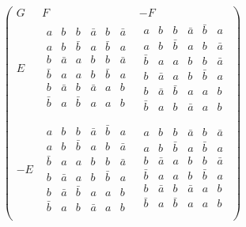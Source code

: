 \documentclass{beamer}
\begin{document}
\begin{frame}

  \[
    \left(
      \begin{array}{c|c|c}
        G & F & -F \\ \hline
        E
          &
            \begin{array}{cccccc}
              a&b&b&\bar{a}&b&\bar{a}\\
              a&b&\bar{b}&a&\bar{b}&a\\
              b&\bar{a}&a&b&b&\bar{a}\\
              \bar{b}&a&a&b&\bar{b}&a\\
              b&\bar{a}&b&\bar{a}&a&b\\
              \bar{b}&a&\bar{b}&a&a&b\\
            \end{array}
          &
          \begin{array}{cccccc}
            a&b&b&\bar{a}&\bar{b}&a\\
            a&b&\bar{b}&a&b&\bar{a}\\
            \bar{b}&a&a&b&b&\bar{a}\\
            b&\bar{a}&a&b&\bar{b}&a\\
            b&\bar{a}&\bar{b}&a&a&b\\
            \bar{b}&a&b&\bar{a}&a&b\\
          \end{array} 
        \\ \hline
        -E
          &
            \begin{array}{cccccc}
              a&b&b&\bar{a}&\bar{b}&a\\
              a&b&\bar{b}&a&b&\bar{a}\\
              \bar{b}&a&a&b&b&\bar{a}\\
              b&\bar{a}&a&b&\bar{b}&a\\
              b&\bar{a}&\bar{b}&a&a&b\\
              \bar{b}&a&b&\bar{a}&a&b\\
            \end{array}
          &
            \begin{array}{cccccc}
              a&b&b&\bar{a}&b&\bar{a}\\
              a&b&\bar{b}&a&\bar{b}&a\\
              b&\bar{a}&a&b&b&\bar{a}\\
              \bar{b}&a&a&b&\bar{b}&a\\
              b&\bar{a}&b&\bar{a}&a&b\\
              \bar{b}&a&\bar{b}&a&a&b\\
            \end{array}
      \end{array}
    \right)
  \]
  
\end{frame}
\end{document}
